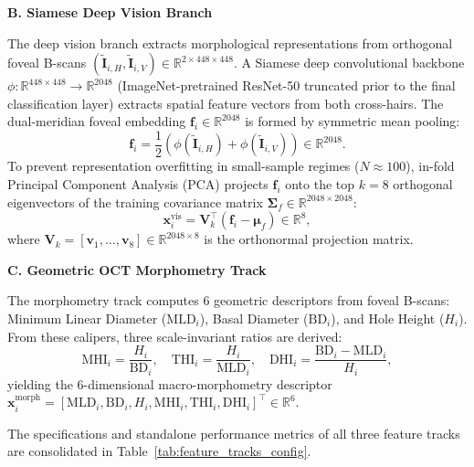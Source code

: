 \documentclass[preprint,12pt]{elsarticle}
\begin{document}
\noindent\textbf{B. Siamese Deep Vision Branch}

The deep vision branch extracts morphological representations from orthogonal foveal B-scans $(\tilde{\mathbf{I}}_{i,H}, \tilde{\mathbf{I}}_{i,V}) \in \mathbb{R}^{2 \times 448 \times 448}$. A Siamese deep convolutional backbone $\phi: \mathbb{R}^{448 \times 448} \to \mathbb{R}^{2048}$ (ImageNet-pretrained ResNet-50 truncated prior to the final classification layer) extracts spatial feature vectors from both cross-hairs. The dual-meridian foveal embedding $\mathbf{f}_i \in \mathbb{R}^{2048}$ is formed by symmetric mean pooling:
\begin{equation}
\mathbf{f}_i = \frac{1}{2}\left( \phi(\tilde{\mathbf{I}}_{i,H}) + \phi(\tilde{\mathbf{I}}_{i,V}) \right) \in \mathbb{R}^{2048}.
\end{equation}
To prevent representation overfitting in small-sample regimes ($N \approx 100$), in-fold Principal Component Analysis (PCA) projects $\mathbf{f}_i$ onto the top $k=8$ orthogonal eigenvectors of the training covariance matrix $\mathbf{\Sigma}_f \in \mathbb{R}^{2048 \times 2048}$:
\begin{equation}
\mathbf{x}_i^{\text{vis}} = \mathbf{V}_k^{\top} \left( \mathbf{f}_i - \bm{\mu}_f \right) \in \mathbb{R}^8,
\end{equation}
where $\mathbf{V}_k = [\mathbf{v}_1, \dots, \mathbf{v}_8] \in \mathbb{R}^{2048 \times 8}$ is the orthonormal projection matrix.

\noindent\textbf{C. Geometric OCT Morphometry Track}

The morphometry track computes 6 geometric descriptors from foveal B-scans: Minimum Linear Diameter ($\text{MLD}_i$), Basal Diameter ($\text{BD}_i$), and Hole Height ($H_i$). From these calipers, three scale-invariant ratios are derived:
\begin{equation}
\text{MHI}_i = \frac{H_i}{\text{BD}_i}, \quad \text{THI}_i = \frac{H_i}{\text{MLD}_i}, \quad \text{DHI}_i = \frac{\text{BD}_i - \text{MLD}_i}{H_i},
\end{equation}
yielding the 6-dimensional macro-morphometry descriptor $\mathbf{x}_i^{\text{morph}} = [\text{MLD}_i, \text{BD}_i, H_i, \text{MHI}_i, \text{THI}_i, \text{DHI}_i]^{\top} \in \mathbb{R}^6$. 

The specifications and standalone performance metrics of all three feature tracks are consolidated in Table~\ref{tab:feature_tracks_config}.
\end{document}
